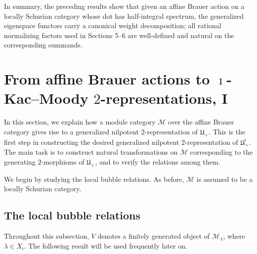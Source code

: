 \documentclass[a4,10pt]{amsart}
\numberwithin{equation}{section}
\theoremstyle{definition}
\begin{document}
In summary, the preceding results show that  given an affine Brauer action on a locally Schurian category whose dot has half-integral spectrum, the
generalized eigenspace functors carry a canonical weight decomposition; all rational normalizing factors used
in Sections 5–6 are well-defined and natural on the corresponding summands.







   



\section{From affine Brauer actions to $\imath$-Kac--Moody $2$-representations, I}\label{modue5}
 In this section, we explain how a module category $\mathcal M$ over the affine Brauer category gives rise to a generalized nilpotent $2$-representation of $\mathfrak U_+$. 
 This is the first step in constructing the desired generalized nilpotent $2$-representation of    $\mathfrak U_+^\imath$. The main task is to construct natural transformations on $\mathcal M$ corresponding to the generating $2$-morphisms of $\mathfrak U_+$, and to verify the relations among them. 
 
We begin by studying the local bubble relations. As before, 
 $\mathcal M$ is assumed to be  a locally Schurian category. 

 
 \subsection{The local bubble relations} Throughout this subsection,  $V$ denotes a  finitely generated object of $ \mathcal M_\lambda$, where  $\lambda\in X_\imath$.  The following result  will be used frequently later on.
\end{document}
